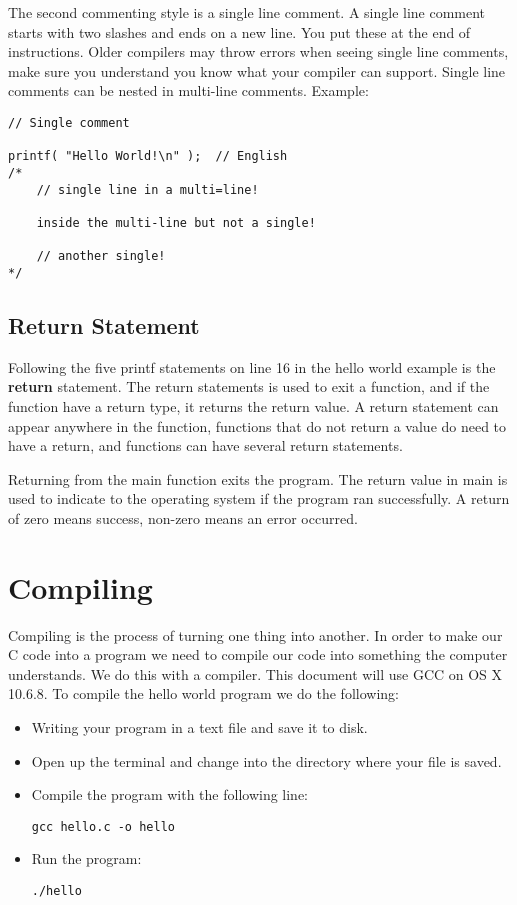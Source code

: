 \documentclass[10pt,a4paper]{paper}
\begin{document}
The second commenting style is a single line comment.  A single line comment starts with two slashes and ends on a new line.  You put these at the end of instructions.  Older compilers may throw errors when seeing single line comments, make sure you understand you know what your compiler can support.  Single line comments can be nested in multi-line comments.  Example:

\begin{lstlisting}
// Single comment

printf( "Hello World!\n" );  // English
/*
	// single line in a multi=line!

	inside the multi-line but not a single!	
	
	// another single!
*/
\end{lstlisting}

\subsection*{Return Statement}

Following the five printf statements on line 16 in the hello world example is the \textbf{return} statement.  The return statements is used to exit a function, and if the function have a return type, it returns the return value.  A return statement can appear anywhere in the function, functions that do not return a value do need to have a return, and functions can have several return statements.

Returning from the main function exits the program.  The return value in main is used to indicate to the operating system if the program ran successfully.  A return of zero means success, non-zero means an error occurred.    


\section{Compiling}

Compiling is the process of turning one thing into another.  In order to make our C code into a program we need to compile our code into something the computer understands.  We do this with a compiler.  This document will use GCC on OS X 10.6.8.  To compile the hello world program we do the following:

\begin{itemize}
\item Writing your program in a text file and save it to disk. 
\item Open up the terminal and change into the directory where your file is saved.
\item Compile the program with the following line:
\begin{verbatim}
gcc hello.c -o hello
\end{verbatim}
\item Run the program:
\begin{verbatim}
./hello
\end{verbatim}
\end{itemize}
\end{document}
